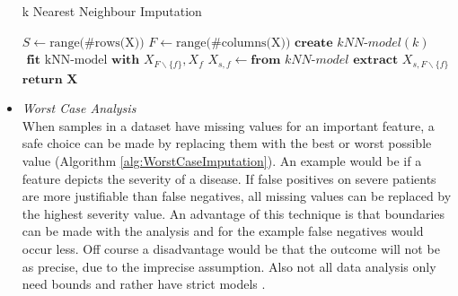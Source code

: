 \documentclass[10pt,a4paper]{report}
\begin{document}
\begin{itemize}
		\begin{algorithm}[H]
			\caption{k Nearest Neighbour Imputation}\label{alg:kNNImputation}
			\begin{algorithmic}[1]
				\State $S \gets \text{range(\#rows(X))}$ 	
				\State $F \gets \text{range(\#columns(X))}$ 	
				 					
				 				 			
				\State $\textbf{create } \textit{kNN-model}(k)$	
				\State $\textbf{ fit } \text{kNN-model} \textbf{ with } X_{F \backslash\{f\}}, X_f$	
				 
				 
				\State $X_{s,f} \gets \textbf{from } \textit{kNN-model} \textbf{ extract } X_{s, F \backslash \{f\}}$ 
				\EndIf
				\EndFor
				\EndIf
				\EndFor
				\State $\textbf{return X}$
				\EndProcedure
			\end{algorithmic}
		\end{algorithm}	
		
		\item \textit{Worst Case Analysis} \\
		When samples in a dataset have missing values for an important feature, a safe choice can be made by replacing them with the best or worst possible value (Algorithm \ref{alg:WorstCaseImputation}). An example would be if a feature depicts the severity of a disease. If false positives on severe patients are more justifiable than false negatives, all missing values can be replaced by the highest severity value. An advantage of this technique is that boundaries can be made with the analysis and for the example false negatives would occur less. Off course a disadvantage would be that the outcome will not be as precise, due to the imprecise assumption. Also not all data analysis only need bounds and rather have strict models \cite{pedersen2017missing, haukoos2007advanced}.
		

\end{itemize}
\end{document}
